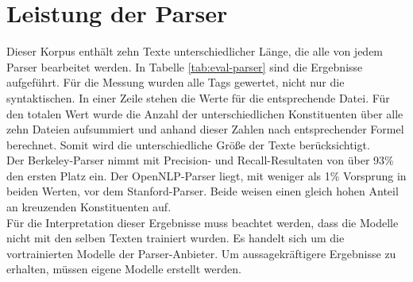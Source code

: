 \section{Leistung der Parser}
Dieser Korpus enthält zehn Texte unterschiedlicher Länge, die alle von jedem Parser bearbeitet werden. In Tabelle \ref{tab:eval-parser} sind die Ergebnisse aufgeführt. Für die Messung wurden alle Tags gewertet, nicht nur die syntaktischen. In einer Zeile stehen die Werte für die entsprechende Datei. Für den totalen Wert wurde die Anzahl der unterschiedlichen Konstituenten über alle zehn Dateien aufsummiert und anhand dieser Zahlen nach entsprechender Formel berechnet. Somit wird die unterschiedliche Größe der Texte berücksichtigt. \\
Der Berkeley-Parser nimmt mit Precision- und Recall-Resultaten von über 93\% den ersten Platz ein. Der OpenNLP-Parser liegt, mit weniger als 1\% Vorsprung in beiden Werten, vor dem Stanford-Parser. Beide weisen einen gleich hohen Anteil an kreuzenden Konstituenten auf.\\
Für die Interpretation dieser Ergebnisse muss beachtet werden, dass die Modelle nicht mit den selben Texten trainiert wurden. Es handelt sich um die vortrainierten Modelle der Parser-Anbieter. Um aussagekräftigere Ergebnisse zu erhalten, müssen eigene Modelle erstellt werden. 
